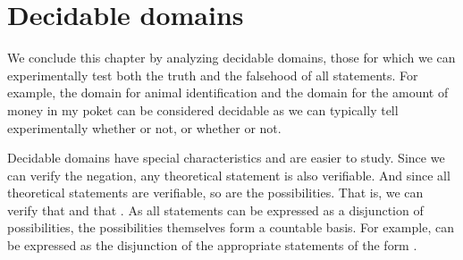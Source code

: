 \documentclass[11pt,letterpaper,fleqn]{memoir} %
\begin{document}
\section{Decidable domains}

We conclude this chapter by analyzing decidable domains, those for which we can experimentally test both the truth and the falsehood of all statements. For example, the domain for animal identification and the domain for the amount of money in my poket can be considered decidable as we can typically tell experimentally whether  or not, or whether  or not.

Decidable domains have special characteristics and are easier to study. Since we can verify the negation, any theoretical statement is also verifiable. And since all theoretical statements are verifiable, so are the possibilities. That is, we can verify that  and that . As all statements can be expressed as a disjunction of possibilities, the possibilities themselves form a countable basis. For example,  can be expressed as the disjunction of the appropriate statements of the form .
\end{document}

